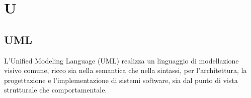 \section{U}

\subsection{UML}%
L'Unified Modeling Language (UML) realizza un linguaggio di modellazione visivo comune, ricco sia nella semantica che nella sintassi, per l'architettura, la progettazione e l'implementazione di sistemi software,  sia dal punto di vista strutturale che comportamentale.

\clearpage